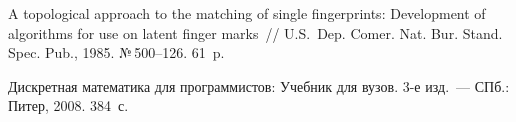 \begin{multicols}{2}
{{\begin{thebibliography}{9}
A topological approach to the matching of single fingerprints: Development of algorithms for use on
latent finger marks~// U.S.\ Dep. Comer. Nat. Bur. Stand. Spec. Pub., 1985. №\,500--126.  61~p.

\label{end\stat}

Дискретная математика для программистов: Учебник для вузов. 3-е изд.~--- СПб.: Питер, 2008.
384~с.

 \end{thebibliography}
}
}

\end{multicols}